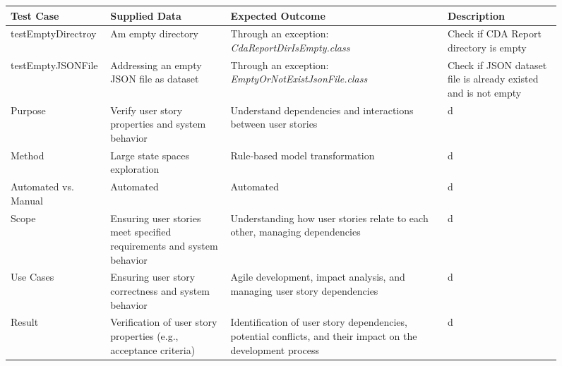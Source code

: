 \begin{figure}[h]
	\begingroup
	\footnotesize
	\centering
	\begin{tabularx}{\textwidth}{l  X  X  X}
		\hline
		Test Case	&Supplied Data &	Expected Outcome &Description \\
		\hline\hline
		testEmptyDirectroy	&Am empty directory	&Through an exception: \textit{CdaReportDirIsEmpty.class}&Check if CDA Report directory is empty \\ 
		
		testEmptyJSONFile& Addressing an empty JSON file as dataset	&	Through an exception: \textit{EmptyOrNotExistJsonFile.class} &Check if JSON dataset file is already existed and is not empty \\
		Purpose	&Verify user story properties and system behavior	&Understand dependencies and interactions between user stories &d \\ 
		Method&	Large state spaces exploration&	Rule-based model transformation &d \\
		Automated vs. Manual&	Automated	&Automated&d \\
		Scope&	Ensuring user stories meet specified requirements and system behavior	&Understanding how user stories relate to each other, managing dependencies&d \\
		Use Cases&	Ensuring user story correctness and system behavior	&Agile development, impact analysis, and managing user story dependencies&d \\
		Result	&Verification of user story properties (e.g., acceptance criteria)	&Identification of user story dependencies, potential conflicts, and their impact on the development process&d \\
		\hline
	\end{tabularx}
	
	\label{tb:test_cases_report_extractor}
	
	\endgroup
\end{figure}

 
%
